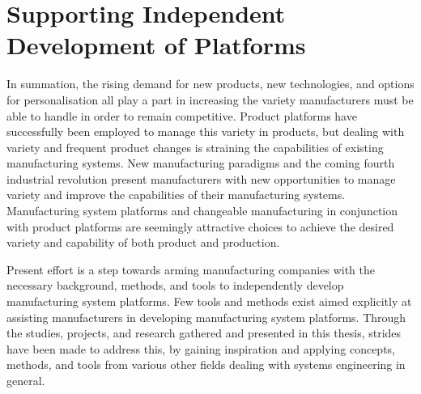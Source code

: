 \section{Supporting Independent Development of Platforms}\label{sec:supPltfDev}
In summation, the rising demand for new products, new technologies, and options for personalisation all play a part in increasing the variety manufacturers must be able to handle in order to remain competitive.
Product platforms have successfully been employed to manage this variety in products, but dealing with variety and frequent product changes is straining the capabilities of existing manufacturing systems.
New manufacturing paradigms and the coming fourth industrial revolution present manufacturers with new opportunities to manage variety and improve the capabilities of their manufacturing systems.
Manufacturing system platforms and changeable manufacturing in conjunction with product platforms are seemingly attractive choices to achieve the desired variety and capability of both product and production.

Present effort is a step towards arming manufacturing companies with the necessary background, methods, and tools to independently develop manufacturing system platforms.
Few tools and methods exist aimed explicitly at assisting manufacturers in developing manufacturing system platforms.
Through the studies, projects, and research gathered and presented in this thesis, strides have been made to address this, by gaining inspiration and applying concepts, methods, and tools from various other fields dealing with systems engineering in general.

